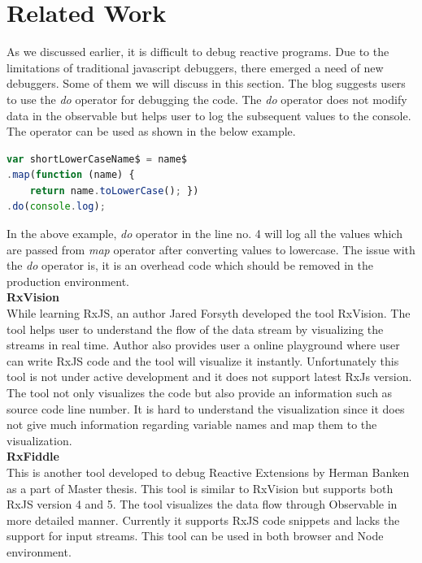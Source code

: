 \section{Related Work}
As we discussed earlier, it is difficult to debug reactive programs. Due to the limitations of traditional javascript debuggers, there emerged a need of new debuggers. Some of them we will discuss in this section. The blog\cite{debugrxjsblog} suggests users to use the \textit{do} operator for debugging the code. The \textit{do} operator does not modify data in the observable but helps user to log the subsequent values to the console. The operator can be used as shown in the below example.
\begin{lstlisting}[language=JavaScript, caption=Do operator usage, label={lst:do-operator-example}]
var shortLowerCaseName$ = name$
.map(function (name) {
	return name.toLowerCase(); })
.do(console.log);
\end{lstlisting}

In the above example, \textit{do} operator in the line no. 4 will log all the values which are passed from \textit{map} operator after converting values to lowercase. The issue with the \textit{do} operator is, it is an overhead code which should be removed in the production environment. 
\leavevmode
\\
\textbf{RxVision}
\\
While learning RxJS, an author Jared Forsyth developed the tool RxVision\cite{rxvision}. The tool helps user to understand the flow of the data stream by visualizing the streams in real time. Author also provides user a online playground where user can write RxJS code and the tool will visualize it instantly\cite{rxvisionplayground}. Unfortunately this tool is not under active development and it does not support latest RxJs version. The tool not only visualizes the code but also provide an information such as source code line number. It is hard to understand the visualization since it does not give much information regarding variable names and map them to the visualization. 
\leavevmode
\\
\textbf{RxFiddle}
\\
This is another tool developed to debug Reactive Extensions by Herman Banken as a part of Master thesis\cite{rxfiddle}.  
This tool is similar to RxVision but supports both RxJS version 4 and 5. The tool visualizes the data flow through Observable in more detailed manner. 
Currently it supports RxJS code snippets and lacks the support for input streams\cite{rxfiddle}. This tool can be used in both browser and Node environment.  


